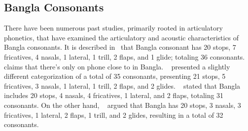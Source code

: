\subsection{Bangla Consonants}
There have been numerous past studies, primarily rooted in articulatory phonetics, that have examined the articulatory and acoustic characteristics of Bangla consonants. It is described in~\citet{hai1964dhwonibijnan} that Bangla consonant has 20 stops, 7 fricatives, 4 nasals, 1 lateral, 1 trill, 2 flaps, and 1 glide; totaling 36 consonants. ~\citet{hai1964dhwonibijnan} claims that there's only on phone close to   in Bangla. ~\citet{huq2002bhasha} presented a slightly different categorization of a total of 35 consonants, presenting 21 stops, 5 fricatives, 3 nasals, 1 lateral, 1 trill, 2 flaps, and 2 glides. ~\citet{morshed1997bhashatatwa} stated that Bangla includes 20 stops, 4 nasals, 4 fricatives, 1 lateral, and 2 flaps, totaling 31 consonants. On the other hand, ~\citet{ali2001dhanibijnaner} argued that Bangla has 20 stops, 3 nasals, 3 fricatives, 1 lateral, 2 flaps, 1 trill, and 2 glides, resulting in a total of 32 consonants.



